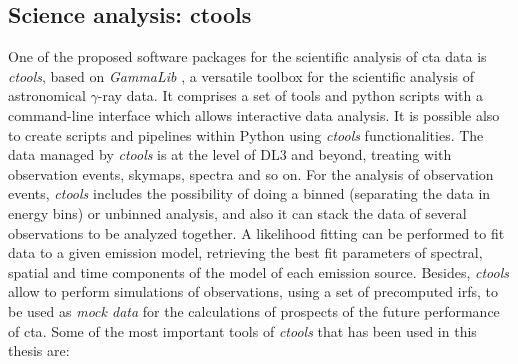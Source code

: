 \documentclass[main.tex]{subfiles}
\begin{document}
\subsection{Science analysis: ctools}

One of the proposed software packages for the scientific analysis of \gls{cta} data is \textit{ctools}, based on \textit{GammaLib} \cite{2016ctools}, a versatile toolbox for the scientific analysis of astronomical $\gamma$-ray data. It comprises a set of tools and python scripts with a command-line interface which allows interactive data analysis. It is possible also to create scripts and pipelines within Python using \textit{ctools} functionalities. The data managed by \textit{ctools} is at the level of DL3 and beyond, treating with observation events, skymaps, spectra and so on. For the analysis of observation events, \textit{ctools} includes the possibility of doing a binned (separating the data in energy bins) or unbinned analysis, and also it can stack the data of several observations to be analyzed together. A likelihood fitting can be performed to fit data to a given emission model, retrieving the best fit parameters of spectral, spatial and time components of the model of each emission source. Besides, \textit{ctools} allow to perform simulations of observations, using a set of precomputed \glspl{irf}, to be used as \textit{mock data} for the calculations of prospects of the future performance of \gls{cta}. Some of the most important tools of \textit{ctools} that has been used in this thesis are: \\
\end{document}
